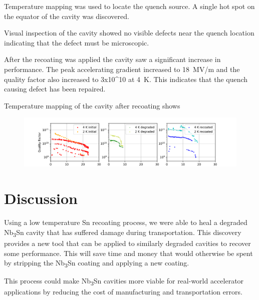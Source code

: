 \documentclass[]{revtex4-2}
\begin{document}
Temperature mapping was used to locate the quench source. A single hot spot on the equator of the cavity was discovered.

Visual inspection of the cavity showed no visible defects near the quench location indicating that the defect must be microscopic.

After the recoating was applied the cavity saw a significant increase in performance. The peak accelerating gradient increased to 18~MV/m and the quality factor also increased to 3x10^10 at 4~K. This indicates that the quench causing defect has been repaired. 

Temperature mapping of the cavity after recoating shows




\begin{figure}[htb]%
    \centering%
    \includegraphics[width=1.0\columnwidth]{./figures/VTS.png}%
    \caption{}%
    \label{fig:VTS}%
\end{figure}





\section{Discussion}
\label{sec:Discussion}

Using a low temperature Sn recoating process, we were able to heal a degraded Nb\textsubscript{3}Sn cavity that has suffered damage during transportation. This discovery provides a new tool that can be applied to similarly degraded cavities to recover some performance. This will save time and money that would otherwise be spent by stripping the Nb\textsubscript{3}Sn coating and applying a new coating.

This process could make Nb\textsubscript{3}Sn cavities more viable for real-world accelerator applications by reducing the cost of manufacturing and transportation errors.
\end{document}
